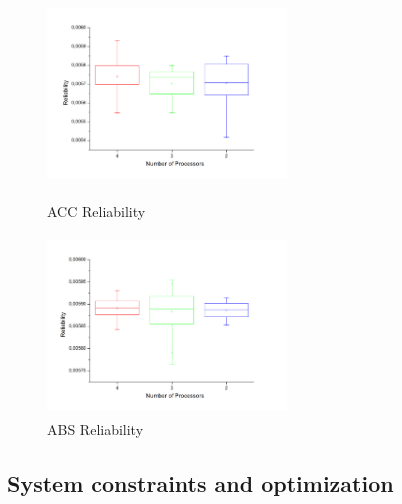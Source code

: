 \documentclass[3p,times,procedia,authoryear,round]{elsarticle}
\begin{document}
\begin{figure}[!htb]
	\centering
	\begin{minipage}{.5\textwidth}
		\centering
		\includegraphics[width=180pt, height=135pt]{graph002.jpg}
		\caption{ACC Reliability}
		\label{pr1}
	\end{minipage}%
	\begin{minipage}{0.5\textwidth}
		\centering
		\includegraphics[width=180pt, height=135pt]{graph001.jpg}
		\caption{ABS Reliability}
		\label{pr2}
	\end{minipage}
\end{figure}  
  
\subsection{System constraints  and  optimization}
\end{document}
